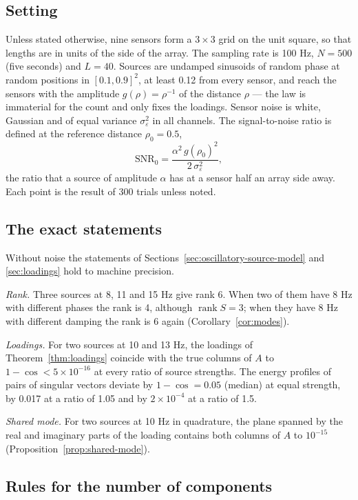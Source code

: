 \documentclass{article}
\begin{document}
\subsection{Setting}\label{sec:setting}

Unless stated otherwise, nine sensors form a $3 \times 3$ grid on the unit square, so that lengths are in units of the side of the array. The sampling rate is 100 Hz, $N = 500$ (five seconds) and $L = 40$. Sources are undamped sinusoids of random phase at random positions in $[0.1, 0.9]^2$, at least 0.12 from every sensor, and reach the sensors with the amplitude $g(\rho) = \rho^{-1}$ of the distance $\rho$ --- the law is immaterial for the count and only fixes the loadings. Sensor noise is white, Gaussian and of equal variance $\sigma_\varepsilon^{2}$ in all channels. The signal-to-noise ratio is defined at the reference distance $\rho_0 = 0.5$, \[
\mathrm{SNR}_0 = \frac{\alpha^{2}\, g(\rho_0)^{2}}{2\, \sigma_\varepsilon^{2}},
\] the ratio that a source of amplitude $\alpha$ has at a sensor half an array side away. Each point is the result of 300 trials unless noted.

\subsection{The exact statements}\label{sec:the-exact-statements}

Without noise the statements of Sections~\ref{sec:oscillatory-source-model} and \ref{sec:loadings} hold to machine precision.

\emph{Rank.} Three sources at 8, 11 and 15 Hz give rank 6. When two of them have 8 Hz with different phases the rank is 4, although $\operatorname{rank} S = 3$; when they have 8 Hz with different damping the rank is 6 again (Corollary~\ref{cor:modes}).

\emph{Loadings.} For two sources at 10 and 13 Hz, the loadings of Theorem~\ref{thm:loadings} coincide with the true columns of $A$ to $1 - \cos < 5 \times 10^{-16}$ at every ratio of source strengths. The energy profiles of pairs of singular vectors deviate by $1 - \cos = 0.05$ (median) at equal strength, by 0.017 at a ratio of 1.05 and by $2 \times 10^{-4}$ at a ratio of 1.5.

\emph{Shared mode.} For two sources at 10 Hz in quadrature, the plane spanned by the real and imaginary parts of the loading contains both columns of $A$ to $10^{-15}$ (Proposition~\ref{prop:shared-mode}).

\subsection{Rules for the number of components}\label{sec:rank-rules}
\end{document}
